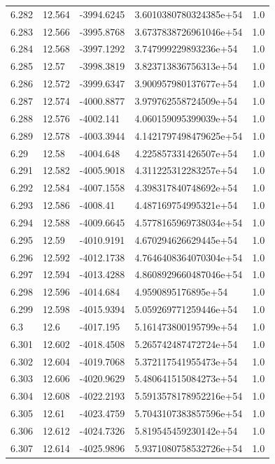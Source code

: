 \begin{tabular}{lllll}
6.282 & 12.564 & -3994.6245 & 3.6010380780324385e+54 & 1.0 \\
6.283 & 12.566 & -3995.8768 & 3.6737838726961046e+54 & 1.0 \\
6.284 & 12.568 & -3997.1292 & 3.747999229893236e+54 & 1.0 \\
6.285 & 12.57 & -3998.3819 & 3.823713836756313e+54 & 1.0 \\
6.286 & 12.572 & -3999.6347 & 3.900957980137677e+54 & 1.0 \\
6.287 & 12.574 & -4000.8877 & 3.979762558724509e+54 & 1.0 \\
6.288 & 12.576 & -4002.141 & 4.060159095399039e+54 & 1.0 \\
6.289 & 12.578 & -4003.3944 & 4.1421797498479625e+54 & 1.0 \\
6.29 & 12.58 & -4004.648 & 4.225857331426507e+54 & 1.0 \\
6.291 & 12.582 & -4005.9018 & 4.311225312283257e+54 & 1.0 \\
6.292 & 12.584 & -4007.1558 & 4.398317840748692e+54 & 1.0 \\
6.293 & 12.586 & -4008.41 & 4.487169754995321e+54 & 1.0 \\
6.294 & 12.588 & -4009.6645 & 4.5778165969738034e+54 & 1.0 \\
6.295 & 12.59 & -4010.9191 & 4.670294626629445e+54 & 1.0 \\
6.296 & 12.592 & -4012.1738 & 4.7646408364070304e+54 & 1.0 \\
6.297 & 12.594 & -4013.4288 & 4.8608929660487046e+54 & 1.0 \\
6.298 & 12.596 & -4014.684 & 4.9590895176895e+54 & 1.0 \\
6.299 & 12.598 & -4015.9394 & 5.059269771259446e+54 & 1.0 \\
6.3 & 12.6 & -4017.195 & 5.161473800195799e+54 & 1.0 \\
6.301 & 12.602 & -4018.4508 & 5.265742487472724e+54 & 1.0 \\
6.302 & 12.604 & -4019.7068 & 5.372117541955473e+54 & 1.0 \\
6.303 & 12.606 & -4020.9629 & 5.480641515084273e+54 & 1.0 \\
6.304 & 12.608 & -4022.2193 & 5.5913578178952216e+54 & 1.0 \\
6.305 & 12.61 & -4023.4759 & 5.7043107383857596e+54 & 1.0 \\
6.306 & 12.612 & -4024.7326 & 5.819545459230142e+54 & 1.0 \\
6.307 & 12.614 & -4025.9896 & 5.9371080758532726e+54 & 1.0 \\

\end{tabular}
